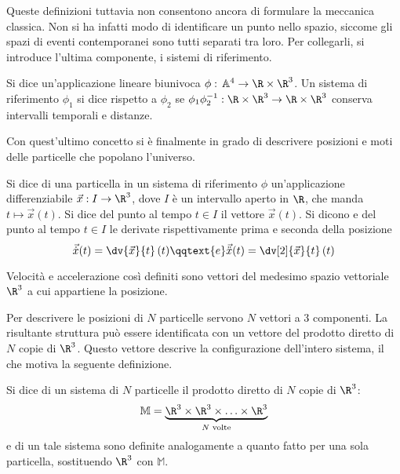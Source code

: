 Queste definizioni tuttavia non consentono ancora di formulare la meccanica classica. Non si ha infatti modo di identificare un punto nello spazio, siccome gli spazi di eventi contemporanei sono tutti separati tra loro. Per collegarli, si introduce l'ultima componente, i sistemi di riferimento.
\begin{definition}
  Si dice  un'applicazione lineare biunivoca $\phi:\, \mathbb{A}^4 \to \R\times \R^3$. Un sistema di riferimento $\phi_1$ si dice  rispetto a $\phi_2$ se $\phi_1 \phi_2^{-1}: \R\times \R^3\to \R\times \R^3$ conserva intervalli temporali e distanze.
\end{definition}

Con quest'ultimo concetto si è finalmente in grado di descrivere posizioni e moti delle particelle che popolano l'universo.
\begin{definition}
  Si dice  di una particella in un sistema di riferimento $\phi$ un'applicazione differenziabile $\vec{x}:I \to \R^3$, dove $I$ è un intervallo aperto in $\R$, che manda $t\mapsto \vec{x}(t)$. Si dice  del punto al tempo $t \in I$ il vettore $\vec{x}(t)$. Si dicono  e  del punto al tempo $t \in I$ le derivate rispettivamente prima e seconda della posizione \begin{equation*}
  \vec{\dot{x}} (t) = \dv{\vec{x}}{t}\, (t) \qqtext{e} \vec{\ddot{x}} (t) = \dv[2]{\vec{x}}{t}\, (t)
  \end{equation*} 
\end{definition}
\begin{remark}
  Velocità e accelerazione così definiti sono vettori del medesimo spazio vettoriale $\R^3$ a cui appartiene la posizione.
\end{remark}

Per descrivere le posizioni di $N$ particelle servono $N$ vettori a 3 componenti. La risultante struttura può essere identificata con un vettore del prodotto diretto di $N$ copie di $\R^3$. Questo vettore descrive la configurazione dell'intero sistema, il che motiva la seguente definizione.
\begin{definition} \label{def:configSpace}
  Si dice  di un sistema di $N$ particelle il prodotto diretto di $N$ copie di $\R^3$: \begin{equation*}
  \mathbb{M} = \underbrace{\R^3 \times \R^3 \times \ldots \times \R^3}_{N \text{ volte}}
  \end{equation*} 
   e  di un tale sistema sono definite analogamente a quanto fatto per una sola particella, sostituendo $\R^3$ con $\mathbb{M}$.
\end{definition}

